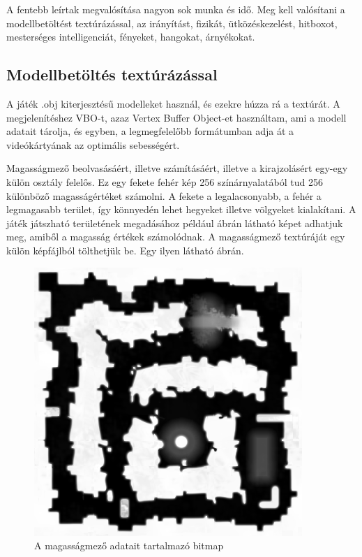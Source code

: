 A fentebb leírtak megvalósítása nagyon sok munka és idő. Meg kell valósítani a modellbetöltést textúrázással, az irányítást, fizikát, ütközéskezelést, hitboxot, mesterséges intelligenciát, fényeket, hangokat, árnyékokat.

\subsection{Modellbetöltés textúrázással}

A játék .obj kiterjesztésű modelleket használ, és ezekre húzza rá a textúrát. A megjelenítéshez VBO-t, azaz Vertex Buffer Object-et használtam, ami a modell adatait tárolja, és egyben, a legmegfelelőbb formátumban adja át a videókártyának az optimális sebességért.

Magasságmező beolvasásáért, illetve számításáért, illetve a kirajzolásért egy-egy külön osztály felelős. Ez egy fekete fehér kép 256 színárnyalatából tud 256 különböző magasságértéket számolni. A fekete a legalacsonyabb, a fehér a legmagasabb terület, így könnyedén lehet hegyeket illetve völgyeket kialakítani. A játék játszható területének megadásához például  ábrán látható képet adhatjuk meg, amiből a magasság értékek számolódnak. A magasságmező textúráját egy külön képfájlból tölthetjük be. Egy ilyen látható  ábrán.

\begin{figure}[h]
\centering
\includegraphics[scale=0.6]{kepek/heightmap.png}
\caption{A magasságmező adatait tartalmazó bitmap}
\label{fig:heightmap}
\end{figure}

